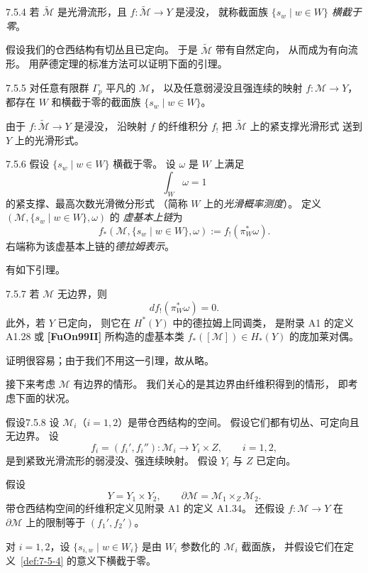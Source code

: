 \begin{definition}{7.5.4}\label{def:7-5-4}
若 $\widetilde{\mathcal M}$ 是光滑流形，且
$f\colon\widetilde{\mathcal M}\to Y$ 是浸没，
就称截面族 $\{s_w\mid w\in W\}$
\emph{横截于零}。
\end{definition}

假设我们的仓西结构有切丛且已定向。
于是 $\widetilde{\mathcal M}$ 带有自然定向，
从而成为有向流形。
用萨德定理的标准方法可以证明下面的引理。

\begin{lemma}{7.5.5}\label{lem:7-5-5}
对任意有限群 $\Gamma_p$ 平凡的 $\mathcal M$，
以及任意弱浸没且强连续的映射
$f\colon\mathcal M\to Y$，
都存在 $W$ 和横截于零的截面族
$\{s_w\mid w\in W\}$。
\end{lemma}

由于 $f\colon\widetilde{\mathcal M}\to Y$ 是浸没，
沿映射 $f$ 的纤维积分 $f_!$ 把
$\widetilde{\mathcal M}$ 上的紧支撑光滑形式
送到 $Y$ 上的光滑形式。

\begin{definition}{7.5.6}\label{def:7-5-6}
假设 $\{s_w\mid w\in W\}$ 横截于零。
设 $\omega$ 是 $W$ 上满足
\[
\int_W\omega=1
\]
的紧支撑、最高次数光滑微分形式
（简称 $W$ 上的\emph{光滑概率测度}）。
定义 $(\mathcal M,\{s_w\mid w\in W\},\omega)$ 的
\emph{虚基本上链}为
\[
f_*(\mathcal M,\{s_w\mid w\in W\},\omega)
:=f_!(\pi_W^*\omega).
\]
右端称为该虚基本上链的\emph{德拉姆表示}。
\end{definition}

有如下引理。

\begin{lemma}{7.5.7}\label{lem:7-5-7}
若 $\mathcal M$ 无边界，则
\[
d f_!(\pi_W^*\omega)=0.
\]
此外，若 $Y$ 已定向，
则它在 $H^*(Y)$ 中的德拉姆上同调类，
是附录 A1 的定义 A1.28 或 \textbf{[FuOn99II]}
所构造的虚基本类
$f_*([\mathcal M])\in H_*(Y)$ 的庞加莱对偶。
\end{lemma}

证明很容易；由于我们不用这一引理，故从略。

接下来考虑 $\mathcal M$ 有边界的情形。
我们关心的是其边界由纤维积得到的情形，
即考虑下面的状况。

\begin{statement}{假设}{7.5.8}\label{ass:7-5-8}
设 $\mathcal M_i$（$i=1,2$）是带仓西结构的空间。
假设它们都有切丛、可定向且无边界。
设
\[
f_i=(f_i',f_i'')\colon
\mathcal M_i\longrightarrow Y_i\times Z,
\qquad i=1,2,
\]
是到紧致光滑流形的弱浸没、强连续映射。
假设 $Y_i$ 与 $Z$ 已定向。

假设
\[
Y=Y_1\times Y_2,
\qquad
\partial\mathcal M=\mathcal M_1\mathbin{\times_Z}\mathcal M_2.
\]
带仓西结构空间的纤维积定义见附录 A1 的定义 A1.34。
还假设 $f\colon\mathcal M\to Y$ 在 $\partial\mathcal M$
上的限制等于 $(f_1',f_2')$。

对 $i=1,2$，设
$\{s_{i,w}\mid w\in W_i\}$
是由 $W_i$ 参数化的 $\mathcal M_i$ 截面族，
并假设它们在定义~\ref{def:7-5-4} 的意义下横截于零。
\end{statement}

